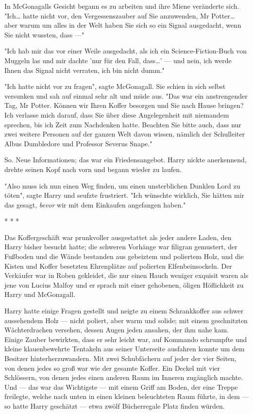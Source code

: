 {In McGonagalls Gesicht begann es zu arbeiten und ihre Miene veränderte sich. "Ich… hatte nicht vor, den Vergessenszauber auf Sie anzuwenden, Mr Potter… aber warum um alles in der Welt haben Sie sich so ein Signal ausgedacht, wenn Sie nicht wussten, dass ---"

"Ich hab mir das vor einer Weile ausgedacht, als ich ein Science-Fiction-Buch von Muggeln las und mir dachte 'nur für den Fall, dass…' --- und nein, ich werde Ihnen das Signal nicht verraten, ich bin nicht dumm."

"Ich hatte nicht vor zu fragen", sagte McGonagall. Sie schien in sich selbst versunken und sah auf einmal sehr alt und müde aus. "Das war ein anstrengender Tag, Mr Potter. Können wir Ihren Koffer besorgen und Sie nach Hause bringen? Ich verlasse mich darauf, dass Sie über diese Angelegenheit mit niemandem sprechen, bis ich Zeit zum Nachdenken hatte. Beachten Sie bitte auch, dass nur zwei weitere Personen auf der ganzen Welt davon wissen, nämlich der Schulleiter Albus Dumbledore und Professor Severus Snape."

So. Neue Informationen; das war ein Friedensangebot. Harry nickte anerkennend, drehte seinen Kopf nach vorn und begann wieder zu laufen.

"Also muss ich nun einen Weg finden, um einen unsterblichen Dunklen Lord zu töten", sagte Harry und seufzte frustriert. "Ich wünschte wirklich, Sie hätten mir das gesagt, \emph{bevor} wir mit dem Einkaufen angefangen haben."

* * *

Das Koffergeschäft war prunkvoller ausgestattet als jeder andere Laden, den Harry bisher besucht hatte; die schweren Vorhänge war filigran gemustert, der Fußboden und die Wände bestanden aus gebeiztem und poliertem Holz, und die Kisten und Koffer besetzten Ehrenplätze auf polierten Elfenbeinsockeln. Der Verkäufer war in Roben gekleidet, die nur einen Hauch weniger exquisit waren als jene von Lucius Malfoy und er sprach mit einer gehobenen, öligen Höflichkeit zu Harry und McGonagall.

Harry hatte einige Fragen gestellt und neigte zu einem Schrankkoffer aus schwer aussehendem Holz --- nicht poliert, aber warm und solide; mit einem geschnitzten Wächterdrachen versehen, dessen Augen jeden ansahen, der ihm nahe kam. Einige Zauber bewirkten, dass er sehr leicht war, auf Kommando schrumpfte und kleine klauenbewehrte Tentakeln aus seiner Unterseite ausfahren konnte um dem Besitzer hinterherzuwandern. Mit zwei Schubfächern auf jeder der vier Seiten, von denen jedes so groß war wie der gesamte Koffer. Ein Deckel mit vier Schlössern, von denen jedes einen anderen Raum im Inneren zugänglich machte. Und --- das war das Wichtigste --- mit einem Griff am Boden, der eine Treppe freilegte, welche nach unten in einen kleinen beleuchteten Raum führte, in dem --- so hatte Harry geschätzt --- etwa zwölf Bücherregale Platz finden würden.

}
